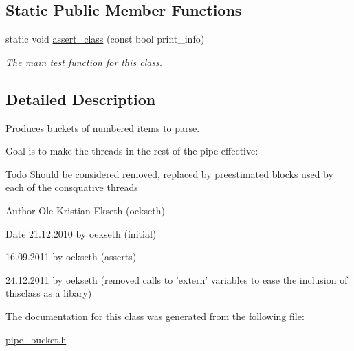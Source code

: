 \subsection*{Static Public Member Functions}
\begin{DoxyCompactItemize}
\item 
\hypertarget{classpipe__bucket_ac00383aa239df244c4af7adae652c303}{
static void \hyperlink{classpipe__bucket_ac00383aa239df244c4af7adae652c303}{assert\_\-class} (const bool print\_\-info)}
\label{classpipe__bucket_ac00383aa239df244c4af7adae652c303}

\begin{DoxyCompactList}\small\item\em The main test function for this class. \end{DoxyCompactList}\end{DoxyCompactItemize}


\subsection{Detailed Description}
Produces buckets of numbered items to parse. 

Goal is to make the threads in the rest of the pipe effective: \begin{Desc}
\item[\hyperlink{todo__todo000001}{Todo}]Should be considered removed, replaced by preestimated blocks used by each of the consquative threads \end{Desc}
\begin{DoxyAuthor}{Author}
Ole Kristian Ekseth (oekseth) 
\end{DoxyAuthor}
\begin{DoxyDate}{Date}
21.12.2010 by oekseth (initial) 

16.09.2011 by oekseth (asserts) 

24.12.2011 by oekseth (removed calls to 'extern' variables to ease the inclusion of thisclass as a libary) 
\end{DoxyDate}


The documentation for this class was generated from the following file:\begin{DoxyCompactItemize}
\item 
\hyperlink{pipe__bucket_8h}{pipe\_\-bucket.h}\end{DoxyCompactItemize}
